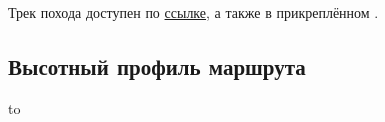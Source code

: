 		Трек похода доступен по \href{https://nakarte.me/#m=10/43.08945/43.14674&l=O&nktl=fI_Vhwot_mXwo3snYI90KA}{ссылке},
		а также в прикреплённом .
	
	
	\subsection{Высотный профиль маршрута}
		\vspace{1cm}

		\hbox to 
